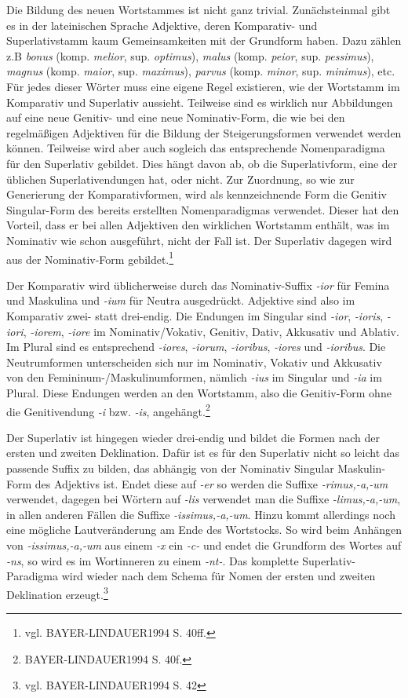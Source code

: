 \documentclass[12pt,abstract=on]{scrreprt}
\begin{document}
Die Bildung des neuen Wortstammes ist nicht ganz trivial. Zunächsteinmal gibt es in der lateinischen Sprache Adjektive, deren Komparativ- und Superlativstamm kaum Gemeinsamkeiten mit der Grundform haben. Dazu zählen z.B \textit{bonus} (komp. \textit{melior}, sup. \textit{optimus}), \textit{malus} (komp. \textit{peior}, sup. \textit{pessimus}), \textit{magnus} (komp. \textit{maior}, sup. \textit{maximus}), \textit{parvus} (komp. \textit{minor}, sup. \textit{minimus}), etc. Für jedes dieser Wörter muss eine eigene Regel existieren, wie der Wortstamm im Komparativ und Superlativ aussieht. Teilweise sind es wirklich nur Abbildungen auf eine neue Genitiv- und eine neue Nominativ-Form, die wie bei den regelmäßigen Adjektiven für die Bildung der Steigerungsformen verwendet werden können. Teilweise wird aber auch sogleich das entsprechende Nomenparadigma für den Superlativ gebildet. Dies hängt davon ab, ob die Superlativform, eine der üblichen Superlativendungen hat, oder nicht. Zur Zuordnung, so wie zur Generierung der Komparativformen, wird als kennzeichnende Form die Genitiv Singular-Form des bereits erstellten Nomenparadigmas verwendet. Dieser hat den Vorteil, dass er bei allen Adjektiven den wirklichen Wortstamm enthält, was im Nominativ wie schon ausgeführt, nicht der Fall ist. Der Superlativ dagegen wird aus der Nominativ-Form gebildet.\footnote{vgl. BAYER-LINDAUER1994 S. 40ff.} \par
Der Komparativ wird üblicherweise durch das Nominativ-Suffix \textit{-ior} für Femina und Maskulina und \textit{-ium} für Neutra ausgedrückt. Adjektive sind also im Komparativ zwei- statt drei-endig. Die Endungen im Singular sind \textit{-ior}, \textit{-ioris}, \textit{-iori}, \textit{-iorem}, \textit{-iore} im Nominativ/Vokativ, Genitiv, Dativ, Akkusativ und Ablativ. Im Plural sind es entsprechend \textit{-iores}, \textit{-iorum}, \textit{-ioribus}, \textit{-iores} und \textit{-ioribus}. Die Neutrumformen unterscheiden sich nur im Nominativ, Vokativ und Akkusativ von den Femininum-/Maskulinumformen, nämlich \textit{-ius} im Singular und \textit{-ia} im Plural. Diese Endungen werden an den Wortstamm, also die Genitiv-Form ohne die Genitivendung \textit{-i} bzw. \textit{-is}, angehängt.\footnote{BAYER-LINDAUER1994 S. 40f.} \par
Der Superlativ ist hingegen wieder drei-endig und bildet die Formen nach der ersten und zweiten Deklination. Dafür ist es für den Superlativ nicht so leicht das passende Suffix zu bilden, das abhängig von der Nominativ Singular Maskulin-Form des Adjektivs ist. Endet diese auf \textit{-er} so werden die Suffixe \textit{-rimus,-a,-um} verwendet, dagegen bei Wörtern auf \textit{-lis} verwendet man die Suffixe \textit{-limus,-a,-um}, in allen anderen Fällen die Suffixe \textit{-issimus,-a,-um}. Hinzu kommt allerdings noch eine mögliche Lautveränderung am Ende des Wortstocks. So wird beim Anhängen von \textit{-issimus,-a,-um} aus einem \textit{-x} ein \textit{-c-} und endet die Grundform des Wortes auf \textit{-ns}, so wird es im Wortinneren zu einem \textit{-nt-}. Das komplette Superlativ-Paradigma wird wieder nach dem Schema für Nomen der ersten und zweiten Deklination erzeugt.\footnote{vgl. BAYER-LINDAUER1994 S. 42} \par
\end{document}
